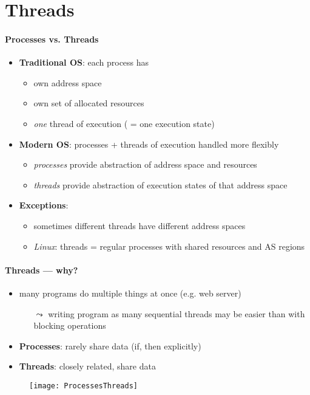 \section{Threads}

\paragraph{Processes vs. Threads}
\begin{itemize}
  \item \textbf{Traditional OS}: each process has
  \begin{itemize}
    \item own address space
    \item own set of allocated resources
    \item \emph{one} thread of execution ( = one execution state)
  \end{itemize}
  \item \textbf{Modern OS}: processes + threads of execution handled more flexibly
  \begin{itemize}
    \item \emph{processes} provide abstraction of address space and resources
    \item \emph{threads} provide abstraction of execution states of that address space
  \end{itemize}
  \item \textbf{Exceptions}:
  \begin{itemize}
    \item sometimes different threads have different address spaces
    \item \emph{Linux}: threads = regular processes with shared resources and AS regions
  \end{itemize}
\end{itemize}

\paragraph{Threads --- why?}
\begin{itemize}
  \item many programs do multiple things at once (e.g. web server)
  \begin{itemize}
    \item[$ \leadsto $] writing program as many sequential threads may be easier than with blocking operations
  \end{itemize}
  \item \textbf{Processes}: rarely share data (if, then explicitly)
  \item \textbf{Threads}: closely related, share data
\end{itemize}
\begin{figure}[h]\centering\label{ProcessesThreads}\texttt{[image: ProcessesThreads]}\end{figure}

